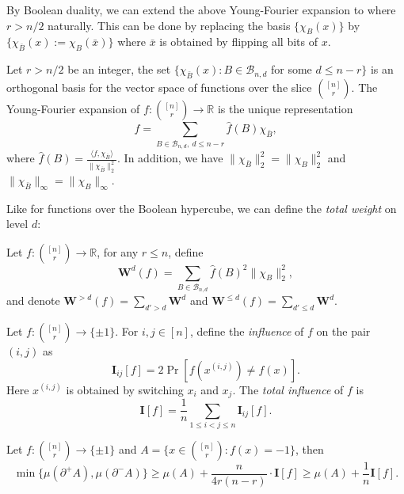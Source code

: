 \documentclass{toc}
\newcommand{\Braket}[1]{\langle#1\rangle}
\newcommand{\W}{\mathbf{W}}
\newcommand{\I}{\mathbf{I}}
\begin{document}
By Boolean duality, we can extend the above Young-Fourier expansion to where $r>n/2$ naturally. This can be done by replacing the basis $\{\chi_B(x)\}$ by $\{\chi_{\bar{B}}(x):=\chi_B(\bar{x})\}$ where $\bar{x}$ is obtained by flipping all bits of $x$.
\begin{corollary}\label{thm:def2}
    Let $r>n/2$ be an integer, the set $\{\chi_{\bar{B}}(x):B\in \mathcal{B}_{n,d}$ for some $d\leq n-r\}$ is an orthogonal basis for the vector space of functions over the slice 
    $\binom{[n]}{r}$. %
    The Young-Fourier expansion of $f:
    \binom{[n]}{r} %
    \rightarrow \mathbb{R}$ is the unique representation
%
\begin{equation} %
f=\sum_{B\in \mathcal{B}_{n,d},\ d\leq n-r}\hat{f}(B)\chi_{\bar{B}},
%
\end{equation} %
where $\hat{f}(B)=\frac{\Braket{f,\chi_{\bar{B}}}}{\|\chi_{\bar{B}}\|_2^2}$. In addition, we have $\|\chi_{\bar{B}}\|_2^2=\|\chi_{B}\|_2^2$ and $\|\chi_{\bar{B}}\|_\infty=\|\chi_{B}\|_\infty$.
\end{corollary}

Like %
for  %
functions over the Boolean hypercube, we can define the 
%
\emph{total weight} %
on level $d$:
\begin{definition} Let $f:
%
\binom{[n]}{r} %
\rightarrow\mathbb{R}$, for any $r\leq n$, define
%
\begin{equation} %
\W^d(f) = \sum_{B\in \mathcal{B}_{n,d}}\hat{f}(B)^2\| \chi_B\|_2^2,
%
\end{equation} %
and denote $\W^{>d}(f) = \sum_{d' > d} \W^d$ and $\W^{\leq d}(f) = \sum_{d'\leq  d} \W^d$.
\end{definition}
\begin{definition}
Let $f:
%
\binom{[n]}{r} %
\rightarrow \{\pm1\}$. For $i,j\in [n]$, define the 
%
\emph{influence} %
of $f$ on the pair $(i,j)$ as
%
\begin{equation} %
\I_{ij}[f]=2\Pr[f(x^{(i,j)})\neq f(x)].
%
\end{equation} %
Here $x^{(i,j)}$ is obtained by switching $x_i$ and $x_j$.
The %
\emph{total influence} %
of $f$ is
%
\begin{equation} %
\I[f]=\frac{1}{n}\sum_{1\leq i<j\leq n}\I_{ij}[f].
%
\end{equation} %
\end{definition}
%
\begin{lemma}\label{key} %
    Let $f:
    \binom{[n]}{r} %
    \rightarrow \{\pm1\}$ and $A=\{x\in 
    \binom{[n]}{r}: %
    f(x)=-1\}$, then
\begin{equation} %
\min\{\mu(\partial^+ A),\mu(\partial^- A)\}\geq \mu(A)+\frac{n}{4r(n-r)}\cdot \I[f]\geq\mu(A)+\frac{1}{n}\I[f].
\end{equation} %
\end{lemma}
\end{document}
